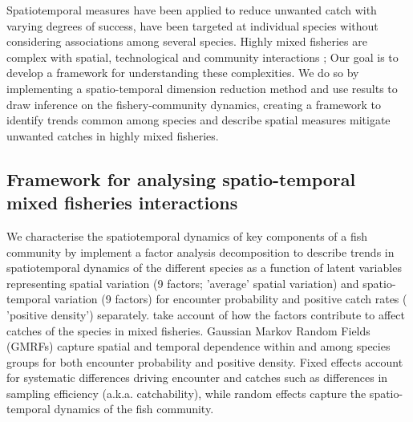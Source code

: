 \documentclass{nature}
\begin{document}
\begin{linenumbers}
Spatiotemporal  measures  have been applied to reduce unwanted catch with
varying degrees of success\cite{Needle2011, Dunn2014a}, 
  have  been
targeted at individual species without considering associations  among several species. Highly mixed fisheries are complex
with spatial, technological and community interactions ;
  Our goal is to develop a
framework for understanding these complexities. We do so by implementing a
spatio-temporal dimension reduction method and use  results to
draw inference on the fishery-community dynamics, creating a framework to
identify trends common among species  and describe
 spatial
measures  mitigate
unwanted catches in highly mixed fisheries.


\subsection{Framework for analysing spatio-temporal mixed fisheries
	interactions}

 We 
characterise the spatiotemporal dynamics of key components of a fish community
by  implement a factor analysis decomposition
to describe trends in spatiotemporal dynamics of the different species as a
function of latent variables \cite{Thorson2015} representing spatial variation
(9 factors;  'average' spatial variation) and
spatio-temporal variation (9 factors) for encounter probability and positive
catch rates ( 'positive density')
separately\cite{Thorson2015a}.   take account of how the factors contribute to affect
catches of the species in mixed fisheries.  Gaussian Markov
Random Fields (GMRFs)  capture spatial and temporal dependence
within and among species groups for both encounter probability and positive
density\cite{Thorson2013}.  Fixed effects  account for
systematic differences driving encounter and catches\deleted{,} such as
differences in sampling efficiency (a.k.a.  catchability), while random effects
capture the spatio-temporal dynamics of the fish community.


\end{linenumbers}
\end{document}
